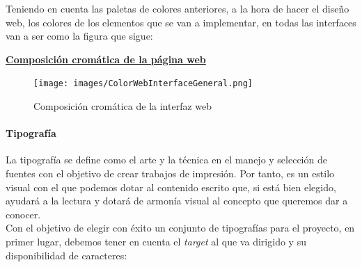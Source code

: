 \documentclass[../ei103948-project-documentation.tex]{subfiles}
\begin{document}
                            Teniendo en cuenta las paletas de colores anteriores, a la hora de hacer el diseño web, los colores de los elementos que se van a implementar, en todas las interfaces van a ser como la figura que sigue:

                            \newpage

                            \begin{center}
                                \underline{\textbf{Composición cromática de la página web}}
                            \end{center}

                            \begin{figure}[H]
                                \begin{center}
                                    \hspace*{-10mm}
                                \texttt{[image: images/ColorWebInterfaceGeneral.png]}
                                \end{center}
                                \caption{Composición cromática de la interfaz web}
                            \end{figure}

                    

                    
                            \paragraph{Tipografía}
                            La tipografía se define como el arte y la técnica en el manejo y selección de fuentes con el objetivo de crear trabajos de impresión. Por tanto, es un estilo visual con el que podemos dotar al contenido escrito que, si está bien elegido, ayudará a la lectura y dotará de armonía visual al concepto que queremos dar a conocer.\\
                    
                            Con el objetivo de elegir con éxito un conjunto de tipografías para el proyecto, en primer lugar, debemos tener en cuenta el \textit{target} al que va dirigido y su disponibilidad de caracteres:
                            
\end{document}
